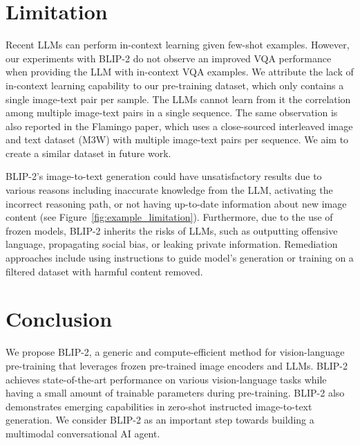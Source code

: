 \section{Limitation}
\label{sec:limitation}
\vspace{-0.5ex}

Recent LLMs can perform in-context learning given few-shot examples.
However,
our experiments with BLIP-2 do not observe an improved VQA performance when providing the LLM with in-context VQA examples.
We attribute the lack of in-context learning capability to our pre-training dataset,
which only contains a single image-text pair per sample.
The LLMs cannot learn from it the correlation among multiple image-text pairs in a single sequence.
The same observation is also reported in the Flamingo paper,
which uses a close-sourced interleaved image and text dataset (M3W) with multiple image-text pairs per sequence.
We aim to create a similar dataset in future work.


BLIP-2's image-to-text generation could have unsatisfactory results due to various reasons including inaccurate knowledge from the LLM,
activating the incorrect reasoning path,
or not having up-to-date information about new image content (see Figure~\ref{fig:example_limitation}).
Furthermore,
due to the use of frozen models,
BLIP-2 inherits the risks of LLMs,
such as outputting offensive language, propagating social bias, or leaking private information.
Remediation approaches include using instructions to guide model's generation or training on a filtered dataset with harmful content removed.


\vspace{-0.5ex}
\section{Conclusion}
\vspace{-0.5ex}
\label{sec:conclusion}
We propose BLIP-2,
a generic and compute-efficient method for vision-language pre-training that leverages frozen pre-trained image encoders and LLMs.
BLIP-2 achieves state-of-the-art performance on various vision-language tasks while having a small amount of trainable parameters during pre-training.
BLIP-2 also demonstrates emerging capabilities in zero-shot instructed image-to-text generation.
We consider BLIP-2 as an important step towards building a multimodal conversational AI agent.